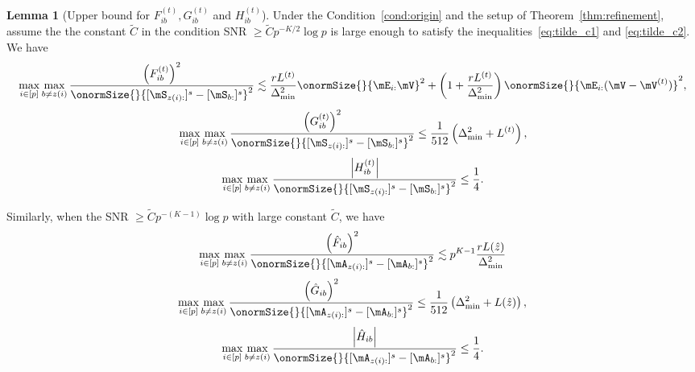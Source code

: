 \documentclass[lettersize,onecolumn,journal]{IEEEtran}
\theoremstyle{definition}
\newtheorem{lem}{Lemma}
\theoremstyle{definition}
\newcommand{\of}[1]{\left(#1\right)}
\newcommand{\aabs}[1]{\left|#1\right|}
\begin{document}
\begin{lem}[Upper bound for $F_{ib}^{(t)}, G_{ib}^{(t)}$ and $H_{ib}^{(t)}$]\label{lem:upper_fgh} Under the Condition~\ref{cond:origin} and the setup of Theorem~\ref{thm:refinement},  assume the the constant $\tilde C$ in the condition SNR $\geq \tilde C p^{-K/2} \log p$ is large enough to satisfy the inequalities~\eqref{eq:tilde_c1} and \eqref{eq:tilde_c2}. We have 
    \begin{equation}\label{eq:fib}
        \max_{i \in [p]} \max_{b \neq z(i)} \frac{\of{F_{ib}^{(t)}}^2}{ \onormSize{}{ [  \mS_{z(i):} ]^s  -  [ \mS_{b:} ]^s }^2 } \lesssim  \frac{r L^{(t)}}{ \Delta_{\min}^2} \onormSize{}{\mE_{i:} \mV}^2 + \of{1 +  \frac{ r L^{(t)}}{ \Delta_{\min}^2}} \onormSize{}{\mE_{i:} (\mV - \mV^{(t)})}^2 ,
    \end{equation}
    \begin{equation}\label{eq:gib}
        \max_{i \in [p]} \max_{b \neq z(i)} \frac{ \of{  G_{ib}^{(t)} }^2  }{ \onormSize{}{ [\mS_{z(i):} ]^s - [\mS_{b:}]^s }^2}  \leq  \frac{1}{512} \of{ \Delta_{\min}^2 +L^{(t)}},
    \end{equation}
    \begin{equation}\label{eq:hib}
        \max_{i \in [p]} \max_{b \neq z(i)}  \frac{ \aabs{  H_{ib}^{(t)} }  }{ \onormSize{}{ [\mS_{z(i):} ]^s - [\mS_{b:}]^s }^2} \leq \frac{1}{4}.
    \end{equation}
    
    Similarly, when the SNR $\geq \tilde C p^{-(K-1)}\log p$ with large constant $\tilde C$, we have 
     \begin{equation}\label{eq:fib_cor}
        \max_{i \in [p]} \max_{b \neq z(i)} \frac{\of{\hat F_{ib}}^2}{ \onormSize{}{ [  \mA_{z(i):} ]^s  -  [ \mA_{b:} ]^s }^2 } \lesssim p^{K-1} \frac{r L(\hat z)}{ \Delta_{\min}^2}
    \end{equation}
    \begin{equation}\label{eq:gib_cor}
        \max_{i \in [p]} \max_{b \neq z(i)} \frac{ \of{  \hat G_{ib} }^2  }{ \onormSize{}{ [\mA_{z(i):} ]^s - [\mA_{b:}]^s }^2}  \leq  \frac{1}{512} \of{ \Delta_{\min}^2 +L(\hat z)},
    \end{equation}
    \begin{equation}\label{eq:hib_cor}
        \max_{i \in [p]} \max_{b \neq z(i)}  \frac{ \aabs{  \hat H_{ib} }  }{ \onormSize{}{ [\mA_{z(i):} ]^s - [\mA_{b:}]^s }^2} \leq \frac{1}{4}.
    \end{equation}
    \end{lem}
    
\end{document}

